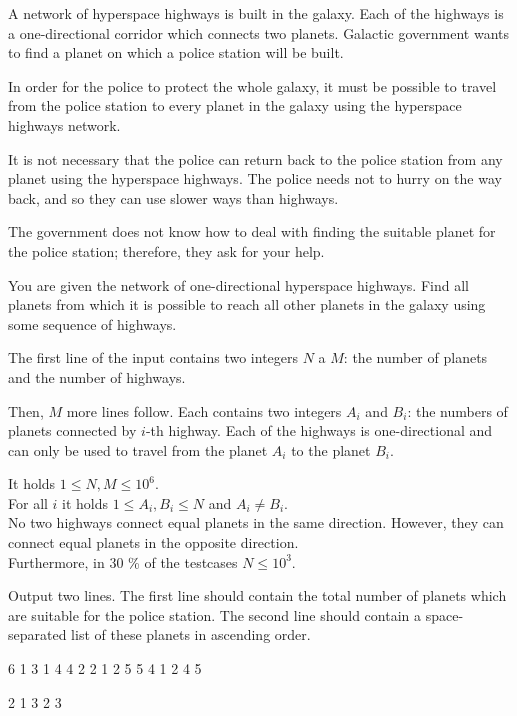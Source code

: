





A network of hyperspace highways is built in the galaxy. Each of the highways
is a one-directional corridor which connects two planets. Galactic government
wants to find a planet on which a police station will be built.

In order for the police to protect the whole galaxy, it must be possible to
travel from the police station to every planet in the galaxy using the
hyperspace highways network.

It is not necessary that the police can return back to the police station from
any planet using the hyperspace highways. The police needs not to hurry on the
way back, and so they can use slower ways than highways.

The government does not know how to deal with finding the suitable planet for
the police station; therefore, they ask for your help.


You are given the network of one-directional hyperspace highways. Find all
planets from which it is possible to reach all other planets in the galaxy using
some sequence of highways.


The first line of the input contains two integers $N$ a $M$: the number of
planets and the number of highways.

Then, $M$ more lines follow. Each contains two integers $A_i$ and $B_i$: the
numbers of planets connected by $i$-th highway. Each of the highways is
one-directional and can only be used to travel from the planet $A_i$ to the
planet $B_i$.

\bigskip
\noindent
It holds $1 \leq N, M \leq 10^6$.\\
For all $i$ it holds $1 \leq A_i, B_i \leq N$ and $A_i \neq B_i$.\\
No two highways connect equal planets in the same direction. However, they can
  connect equal planets in the opposite direction.\\
Furthermore, in 30 \% of the testcases $N \leq 10^3$.


Output two lines. The first line should contain the total number of planets
which are suitable for the police station. The second line should contain
a space-separated list of these planets in ascending order.


 6
1 3
1 4
4 2
2 1
2 5
5 4
1 2 4 5
\sampleEND

 2
1 3
2 3
~
\sampleEND


